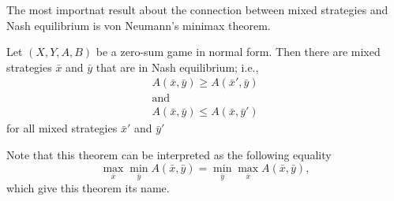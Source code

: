 The most importnat result about the connection between mixed strategies and Nash
equilibrium is von Neumann's minimax theorem.
\begin{theorem}
  Let $(X, Y, A, B)$ be a zero-sum game in normal form. Then there are mixed
  strategies $\bar{x}$ and $\bar{y}$ that are in Nash equilibrium; i.e., 
  \begin{gather*}
    A(\bar{x}, \bar{y}) \ge A(\bar{x}', \bar{y}) \\
    \text{and} \\
    A(\bar{x}, \bar{y}) \le A(\bar{x}, \bar{y}')
  \end{gather*}
  for all mixed strategies $\bar{x}'$ and $\bar{y}'$
\end{theorem}
Note that this theorem can be interpreted as the following equality 
\[
  \max_{\bar{x}} \min_{\bar{y}} A(\bar{x}, \bar{y}) = 
  \min_{\bar{y}} \max_{\bar{x}} A(\bar{x}, \bar{y}),
\]
which give this theorem its name.
